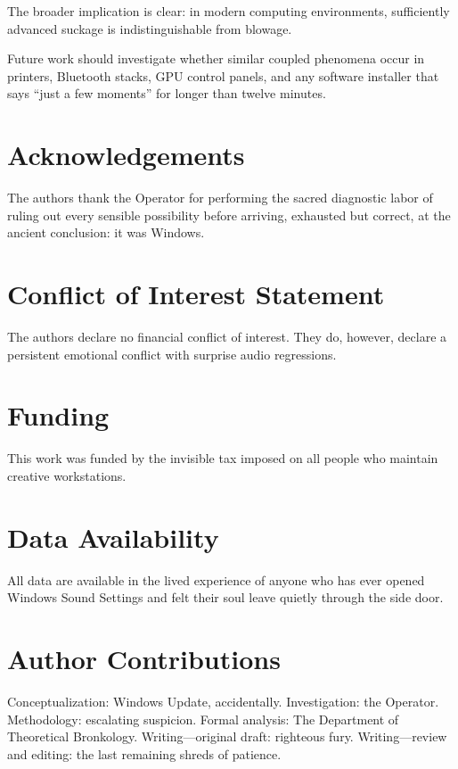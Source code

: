\documentclass[10pt,twocolumn]{article}
\begin{document}
The broader implication is clear: in modern computing environments, sufficiently advanced suckage is indistinguishable from blowage.

Future work should investigate whether similar coupled phenomena occur in printers, Bluetooth stacks, GPU control panels, and any software installer that says ``just a few moments'' for longer than twelve minutes.

\section*{Acknowledgements}

The authors thank the Operator for performing the sacred diagnostic labor of ruling out every sensible possibility before arriving, exhausted but correct, at the ancient conclusion: it was Windows.

\section*{Conflict of Interest Statement}

The authors declare no financial conflict of interest. They do, however, declare a persistent emotional conflict with surprise audio regressions.

\section*{Funding}

This work was funded by the invisible tax imposed on all people who maintain creative workstations.

\section*{Data Availability}

All data are available in the lived experience of anyone who has ever opened Windows Sound Settings and felt their soul leave quietly through the side door.

\section*{Author Contributions}

Conceptualization: Windows Update, accidentally. Investigation: the Operator. Methodology: escalating suspicion. Formal analysis: The Department of Theoretical Bronkology. Writing---original draft: righteous fury. Writing---review and editing: the last remaining shreds of patience.
\end{document}
